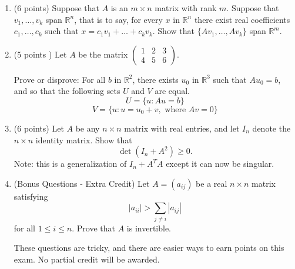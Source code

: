 \documentclass[12pt]{article}
\begin{document}
\begin{enumerate}
    
    \item (6 points) Suppose that \( A \) is an \( m \times n \) matrix with rank \( m \). Suppose that \( v_1, \ldots, v_k \) span \( \mathbb{R}^n \), that is to say, for every \( x \) in \( \mathbb{R}^n \) there exist real coefficients \( c_1, \ldots, c_k \) such that \( x = c_1 v_1 + \ldots + c_k v_k \). Show that \( \{ A v_1, \ldots, A v_k \} \) span \( \mathbb{R}^m \).

    
    \item (5 points ) Let \( A \) be the matrix \( \begin{pmatrix} 1 & 2 & 3 \\ 4 & 5 & 6 \end{pmatrix} \).
      
      Prove or disprove: For all \( b \) in \( \mathbb{R}^2 \), there exists \( u_0 \) in \( \mathbb{R}^3 \) such that \( Au_0 = b \), and so that the following sets \( U \) and \( V \) are equal.
        \[
        U = \{ u : Au = b \}
        \]
        \[
        V = \{ u : u = u_0 + v, \text{ where } Av = 0 \}
        \]


    \item (6 points) Let \( A \) be any \( n \times n \) matrix with real entries, and let \( I_n \) denote the \( n \times n \) identity matrix. Show that
    \[
    \det(I_n + A^2) \geq 0.
    \]
    Note: this is a generalization of $I_n+A^TA$ except it can now be singular. 
    \item (Bonus Questions - Extra Credit) Let \( A = (a_{ij}) \) be a real \( n \times n \) matrix satisfying
\[
|a_{ii}| > \sum_{j \neq i} |a_{ij}|
\]
for all \( 1 \leq i \leq n \). Prove that \( A \) is invertible.


\noindent{} These questions are tricky, and there are easier ways to earn points on this exam. No partial credit will be awarded.    
    
\end{enumerate}
\end{document}
